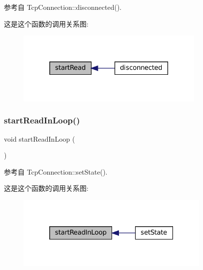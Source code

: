 参考自 Tcp\+Connection\+::disconnected().

这是这个函数的调用关系图\+:
\nopagebreak
\begin{figure}[H]
\begin{center}
\leavevmode
\includegraphics[width=260pt]{classmuduo_1_1net_1_1TcpConnection_a2fb6cbd3d3abf25782d51457ab157b24_icgraph}
\end{center}
\end{figure}
\mbox{\label{classmuduo_1_1net_1_1TcpConnection_a813d02ba7cf0a0263aca2ae970676f44}} 
\subsubsection{\texorpdfstring{start\+Read\+In\+Loop()}{startReadInLoop()}}
{\footnotesize\ttfamily void start\+Read\+In\+Loop (\begin{DoxyParamCaption}{ }\end{DoxyParamCaption})\hspace{0.3cm}{\ttfamily [private]}}



参考自 Tcp\+Connection\+::set\+State().

这是这个函数的调用关系图\+:
\nopagebreak
\begin{figure}[H]
\begin{center}
\leavevmode
\includegraphics[width=268pt]{classmuduo_1_1net_1_1TcpConnection_a813d02ba7cf0a0263aca2ae970676f44_icgraph}
\end{center}
\end{figure}
\mbox{\label{classmuduo_1_1net_1_1TcpConnection_ad5814262e3c9cdcdeb4b25e9b18f9b44}} 
